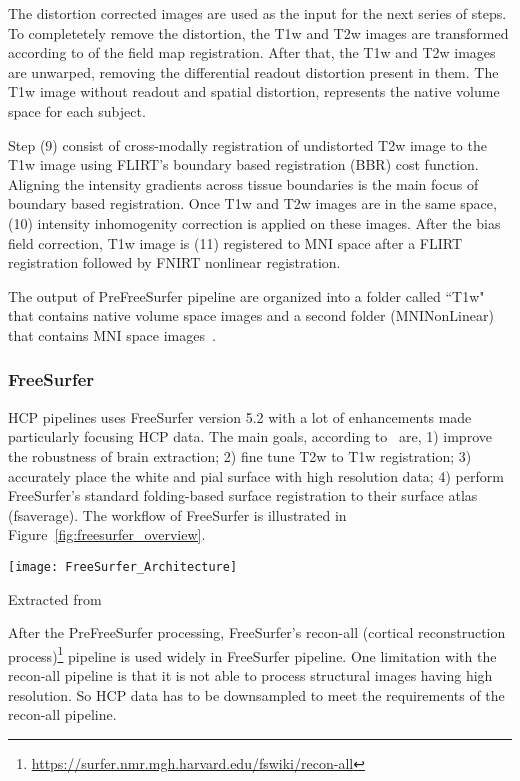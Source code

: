 The distortion corrected images are used as the input for the next series of steps. To completetely remove the distortion, the T1w and T2w images are transformed according to of the field map registration. After that, the T1w and T2w images are unwarped, removing the differential readout distortion present in them. The T1w image without readout and spatial distortion, represents the native volume space for each subject.

Step (9) consist of cross-modally registration of undistorted T2w image to the T1w image using FLIRT's boundary based registration (BBR) cost function. Aligning the intensity gradients across tissue boundaries is the main focus of boundary based registration. Once T1w and T2w images are in the same space, (10) intensity inhomogenity correction is applied on these images. After the bias field correction, T1w image is (11) registered to MNI space after a FLIRT registration followed by FNIRT nonlinear registration.

The output of PreFreeSurfer pipeline are organized into a folder called ``T1w" that contains native volume space images and a second folder (MNINonLinear) that contains MNI space images~\cite{Gla13}.

\subsubsection{FreeSurfer}
HCP pipelines uses FreeSurfer version 5.2 with a lot of enhancements made particularly focusing HCP data. The main goals, according to~\cite{Gla13} are, 1) improve the robustness of brain extraction; 2) fine tune T2w to T1w registration; 3) accurately place the white and pial surface with high resolution data; 4) perform FreeSurfer's standard folding-based surface registration to their surface atlas (fsaverage). The workflow of FreeSurfer is illustrated in Figure~\ref{fig:freesurfer_overview}.

\begin{center}
  \texttt{[image: FreeSurfer\_Architecture]}
  \label{fig:freesurfer_overview}
  \caption*{Extracted from \cite{Gla13}}
\end{center}

After the PreFreeSurfer processing, FreeSurfer's recon-all (cortical reconstruction process)\footnote{\url{https://surfer.nmr.mgh.harvard.edu/fswiki/recon-all}} pipeline is used widely in FreeSurfer pipeline. One limitation with the recon-all pipeline is that it is not able to process structural images having high resolution. So HCP data has to be downsampled to meet the requirements of the recon-all pipeline.

